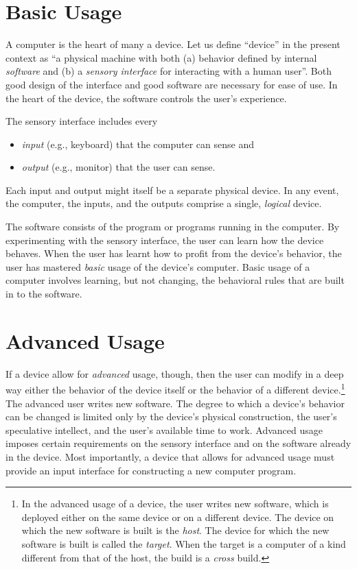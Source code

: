 \documentclass[twocolumn]{book}
\begin{document}
\section{Basic Usage}

A computer is the heart of many a device.  Let us define ``device'' in the
present context as ``a physical machine with both (a) behavior defined by
internal \emph{software} and (b) a \emph{sensory interface} for interacting
with a human user''.  Both good design of the interface and good software are
necessary for ease of use.  In the heart of the device, the software controls
the user's experience.

The sensory interface includes every
\begin{itemize}
   \item \emph{input} (e.g., keyboard) that the computer can sense and
   \item \emph{output} (e.g., monitor) that the user can sense.
\end{itemize}
Each input and output might itself be a separate physical device.  In any
event, the computer, the inputs, and the outputs comprise a single,
\emph{logical} device.

The software consists of the program or programs running in the computer.  By
experimenting with the sensory interface, the user can learn how the device
behaves.  When the user has learnt how to profit from the device's behavior,
the user has mastered \emph{basic} usage of the device's computer.  Basic usage
of a computer involves learning, but not changing, the behavioral rules that
are built in to the software.

\section{Advanced Usage}

If a device allow for \emph{advanced} usage, though, then the user can modify
in a deep way either the behavior of the device itself or the behavior of a
different device.\footnote{%
   In the advanced usage of a device, the user writes new software, which is
   deployed either on the same device or on a different device.  The device on
   which the new software is built is the \emph{host}.  The device for which
   the new software is built is called the \emph{target}.  When the target is a
   computer of a kind different from that of the host, the build is a
   \emph{cross} build.}
The advanced user writes new software.  The degree to which a device's behavior
can be changed is limited only by the device's physical construction, the
user's speculative intellect, and the user's available time to work.  Advanced
usage imposes certain requirements on the sensory interface and on the software
already in the device.  Most importantly, a device that allows for advanced
usage must provide an input interface for constructing a new computer program.
\end{document}
